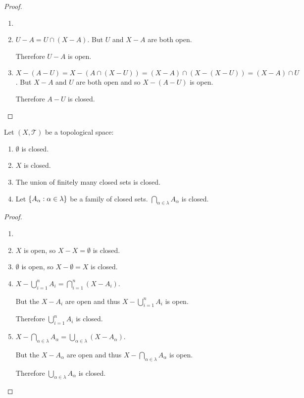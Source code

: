 \documentclass[letterpaper,12pt,fleqn]{article}
\newcommand{\T}{\mathscr{T}}
\renewcommand{\a}{\alpha}
\renewcommand{\l}{\lambda}
\begin{document}
\begin{proof}
  \begin{enumerate}
    \item[]
    \item \(U-A=U\cap(X-A)\).  But \(U\) and \(X-A\) are both open.

      Therefore \(U-A\) is open.

    \item \(X-(A-U)=X-(A\cap(X-U))=(X-A)\cap(X-(X-U))=(X-A)\cap U\).  But \(X-A\) and \(U\) are both open and so
      \(X-(A-U)\) is open.

      Therefore \(A-U\) is closed.
  \end{enumerate}
\end{proof}

\begin{theorem}
  Let \((X,\T)\) be a topological space:
  \begin{enumerate}
  \item \(\emptyset\) is closed.
  \item \(X\) is closed.
  \item The union of finitely many closed sets is closed.
  \item Let \(\set{A_{\a}:\a\in\l}\) be a family of closed sets.  \(\bigcap_{\a\in\l}A_{\a}\) is closed.
  \end{enumerate}
\end{theorem}

\begin{proof}
  \begin{enumerate}
  \item[]
  \item \(X\) is open, so \(X-X=\emptyset\) is closed.
  \item \(\emptyset\) is open, so \(X-\emptyset=X\) is closed.
  \item \(X-\bigcup_{i=1}^nA_i=\bigcap_{i=1}^n(X-A_i)\).

    But the \(X-A_i\) are open and thus \(X-\bigcup_{i=1}^nA_i\) is open.

    Therefore \(\bigcup_{i=1}^nA_i\) is closed.

  \item \(X-\bigcap_{\a\in\l}A_{\a}=\bigcup_{\a\in\l}(X-A_{\a})\).

    But the \(X-A_{\a}\) are open and thus \(X-\bigcap_{\a\in\l}A_{\a}\) is open.

    Therefore \(\bigcup_{\a\in\l}A_{\a}\) is closed.
  \end{enumerate}
\end{proof}
\end{document}
